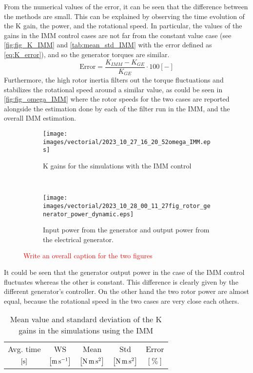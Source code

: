 From the numerical values of the error, it can be seen that the difference between the methods are small. This can be explained by observing the time evolution of the K gain, the power, and the rotational speed. In particular, the values of the gains in the IMM control cases are not far from the constant value case (see \autoref{fig:fig_K_IMM} and \autoref{tab:mean_std_IMM} with the error defined as \autoref{eq:K_error}), and so the generator torques are similar.
\begin{equation}
  \text{Error} = \frac{K_{IMM}-K_{GE}}{K_{GE}}\cdot 100 \left[-\right]
  \label{eq:K_error}
\end{equation}
Furthermore, the high rotor inertia filters out the torque fluctuations and stabilizes the rotational speed around a similar value, as could be seen in \autoref{fig:fig_omega_IMM} where the rotor speeds for the two cases are reported alongside the estimation done by each of the filter run in the IMM, and the overall IMM estimation. 

\begin{figure}[htb]
  \centering
  \begin{subfigure}{0.49\textwidth}
    \centering
    \texttt{[image: images/vectorial/2023\_10\_27\_16\_20\_52omega\_IMM.eps]}
    \caption{K gains for the simulations with the IMM control}
    \label{fig:fig_K_IMM}
  \end{subfigure}
  \\
  \begin{subfigure}{0.65\textwidth}
    \centering
    \texttt{[image: images/vectorial/2023\_10\_28\_00\_11\_27fig\_rotor\_generator\_power\_dynamic.eps]}
    \caption{Input power from the generator and output power from the electrical generator. }
    \label{fig:fig_power_IMM}
  \end{subfigure}
  \caption{\textcolor{red}{Write an overall caption for the two figures}}
\end{figure}
It could be seen that the generator output power in the case of the IMM control fluctuates whereas the other is constant. This difference is clearly given by the different generator's controller. On the other hand the two rotor power are almost equal, because the rotational speed in the two cases are very close each others. 

\begin{table}[htb]
  \caption{Mean value and standard deviation of the K gains in the simulations using the IMM}
  \centering
  \begin{tabular}{ccccc}
    \toprule
    Avg. time & WS & Mean & Std & Error \\
    $\left[\si{\second}\right]$ & $\left[\si{\meter\per\second}\right]$ & $\left[\si{\newton\meter\square\second}\right]$ & $\left[\si{\newton\meter\square\second}\right]$ & $\left[\%\right]$\\  \midrule
    
  \end{tabular}
  \label{tab:mean_std_IMM}
\end{table}

